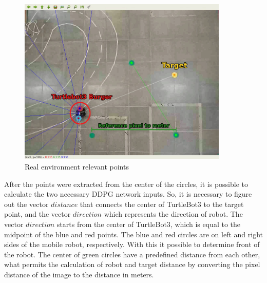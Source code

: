 \begin{figure}[H]
\centerline{\includegraphics[width=10cm]{images/pixel_to_meter.png}}
\caption{Real environment relevant points}
\label{fig:pixel_to_meter}
\end{figure}


After the points were extracted from the center of the circles, it is possible to calculate the two necessary DDPG network inputs.
So, it is necessary to figure out the vector $distance$ that connects the center of TurtleBot3 to the target point, and the vector $direction$ which represents the direction of robot.
The vector $direction$ starts from the center of TurtleBot3, which is equal to the midpoint of the blue and red points.
The blue and red circles are on left and right sides of the mobile robot, respectively.
With this it possible to determine front of the robot.
The center of green circles have a predefined distance from each other, what permits the calculation of robot and target distance by converting the pixel distance of the image to the distance in meters.







